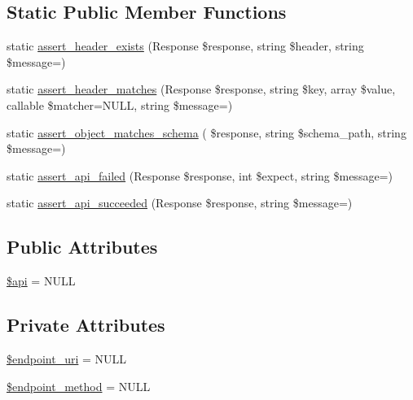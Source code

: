\subsection*{Static Public Member Functions}
\begin{DoxyCompactItemize}
\item 
static \hyperlink{classlibresignage_1_1tests_1_1common_1_1classes_1_1APITestCase_a0d68b3843c7a4c6c77a33fdc5c11953a}{assert\+\_\+header\+\_\+exists} (Response \$response, string \$header, string \$message=\textquotesingle{}\textquotesingle{})
\item 
static \hyperlink{classlibresignage_1_1tests_1_1common_1_1classes_1_1APITestCase_a453390ee3c34210b4376f64e30d4a4a9}{assert\+\_\+header\+\_\+matches} (Response \$response, string \$key, array \$value, callable \$matcher=N\+U\+LL, string \$message=\textquotesingle{}\textquotesingle{})
\item 
static \hyperlink{classlibresignage_1_1tests_1_1common_1_1classes_1_1APITestCase_a7f758f7ef28b400b51bed77d049c85cb}{assert\+\_\+object\+\_\+matches\+\_\+schema} ( \$response, string \$schema\+\_\+path, string \$message=\textquotesingle{}\textquotesingle{})
\item 
static \hyperlink{classlibresignage_1_1tests_1_1common_1_1classes_1_1APITestCase_adacfcb32886891bdce24c2f92643e4d7}{assert\+\_\+api\+\_\+failed} (Response \$response, int \$expect, string \$message=\textquotesingle{}\textquotesingle{})
\item 
static \hyperlink{classlibresignage_1_1tests_1_1common_1_1classes_1_1APITestCase_a2376792bb5ecd3587d36387f7bf1f906}{assert\+\_\+api\+\_\+succeeded} (Response \$response, string \$message=\textquotesingle{}\textquotesingle{})
\end{DoxyCompactItemize}
\subsection*{Public Attributes}
\begin{DoxyCompactItemize}
\item 
\hyperlink{classlibresignage_1_1tests_1_1common_1_1classes_1_1APITestCase_a75c26d81afefdb1b7978cfc1e3d27b83}{\$api} = N\+U\+LL
\end{DoxyCompactItemize}
\subsection*{Private Attributes}
\begin{DoxyCompactItemize}
\item 
\hyperlink{classlibresignage_1_1tests_1_1common_1_1classes_1_1APITestCase_a59f671879fe0185cd739bf8fecb356da}{\$endpoint\+\_\+uri} = N\+U\+LL
\item 
\hyperlink{classlibresignage_1_1tests_1_1common_1_1classes_1_1APITestCase_a28aa1ad03c4657537afdb45a13893de9}{\$endpoint\+\_\+method} = N\+U\+LL
\end{DoxyCompactItemize}


